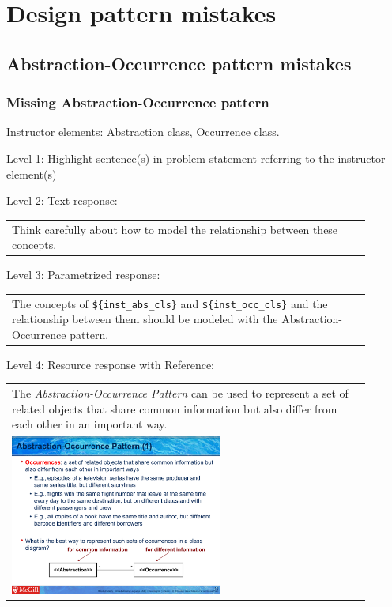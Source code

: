 \section{Design pattern mistakes}

\subsection{Abstraction-Occurrence pattern mistakes}

\subsubsection{Missing Abstraction-Occurrence pattern}

Instructor elements: Abstraction class, Occurrence class. \medskip

\noindent Level 1: Highlight sentence(s) in problem statement referring to the instructor element(s) \medskip

\noindent Level 2: Text response: \medskip

\begin{tabular}{|p{0.9\linewidth}}
Think carefully about how to model the relationship between these concepts.
\end{tabular} \medskip

\noindent Level 3: Parametrized response: \medskip

\begin{tabular}{|p{0.9\linewidth}}
The concepts of \verb|${inst_abs_cls}| and \verb|${inst_occ_cls}| and the relationship between them should be modeled with the Abstraction-Occurrence pattern.
\end{tabular} \medskip

\noindent Level 4: Resource response with Reference: \medskip

\begin{tabular}{|p{0.9\linewidth}}
The \textit{Abstraction-Occurrence Pattern} can be used to 
represent a set of related objects that share common information but also differ
from each other in an important way.

\\
\includegraphics[width=0.6\textwidth]{images/abstraction_occurrence.png}
\end{tabular} \medskip



